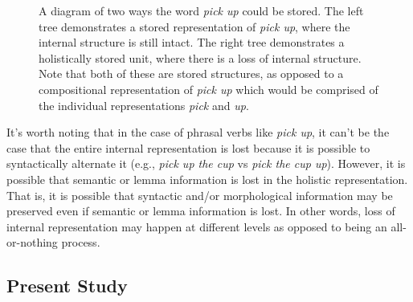 \documentclass[
  12pt,
  letterpaper,
]{scrreport}
\begin{document}
\begin{figure}[htbp]

\caption{\label{fig-lossinternalstructure}A diagram of two ways the word
\emph{pick up} could be stored. The left tree demonstrates a stored
representation of \emph{pick up}, where the internal structure is still
intact. The right tree demonstrates a holistically stored unit, where
there is a loss of internal structure. Note that both of these are
stored structures, as opposed to a compositional representation of
\emph{pick up} which would be comprised of the individual
representations \emph{pick} and \emph{up}.}


\end{figure}%

It's worth noting that in the case of phrasal verbs like \emph{pick up},
it can't be the case that the entire internal representation is lost
because it is possible to syntactically alternate it (e.g., \emph{pick
up the cup} vs \emph{pick the cup up}). However, it is possible that
semantic or lemma information is lost in the holistic representation.
That is, it is possible that syntactic and/or morphological information
may be preserved even if semantic or lemma information is lost. In other
words, loss of internal representation may happen at different levels as
opposed to being an all-or-nothing process.

\subsection{Present Study}\label{present-study}
\end{document}
